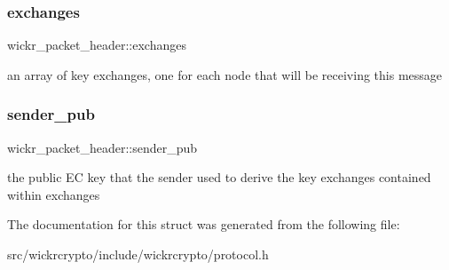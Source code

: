 \subsubsection{\texorpdfstring{exchanges}{exchanges}}
{\footnotesize\ttfamily wickr\+\_\+packet\+\_\+header\+::exchanges}

an array of key exchanges, one for each node that will be receiving this message \mbox{\label{structwickr__packet__header_aa32926d47dd2639030523593bfefc998}} 
\subsubsection{\texorpdfstring{sender\+\_\+pub}{sender\_pub}}
{\footnotesize\ttfamily wickr\+\_\+packet\+\_\+header\+::sender\+\_\+pub}

the public EC key that the sender used to derive the key exchanges contained within \textquotesingle{}exchanges\textquotesingle{} 

The documentation for this struct was generated from the following file\+:\begin{DoxyCompactItemize}
\item 
src/wickrcrypto/include/wickrcrypto/protocol.\+h\end{DoxyCompactItemize}

